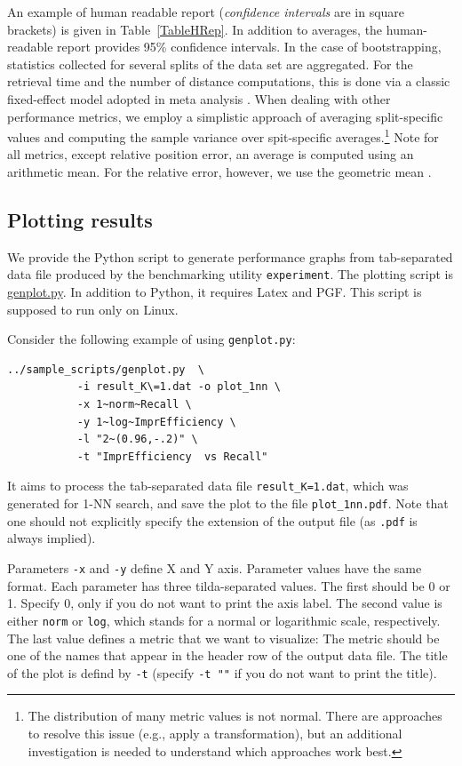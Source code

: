 \documentclass[runningheads,a4paper]{llncs}
\newcommand{\replocfile}{https://github.com/searchivarius/NonMetricSpaceLib/blob/develop/}
\newcommand{\ttt}[1]{\texttt{#1}}
\begin{document}
{An example of human readable report (\emph{confidence intervals} are in square brackets)
is given in Table~\ref{TableHRep}.
In addition to averages, the human-readable report provides 95\% confidence intervals.
In the case of bootstrapping, statistics collected for several splits of the data set are aggregated.
For the retrieval time and the number of distance computations,
this is done via a classic fixed-effect model adopted in meta analysis \cite{Hedges_and_Vevea:1998}.
When dealing with other performance metrics, 
we employ a simplistic approach of averaging split-specific values
and computing the sample variance over spit-specific averages.\footnote{The distribution
of many metric values is not normal. There are approaches to resolve this issue (e.g., apply a transformation),
but an additional investigation is needed to understand which approaches work best.}
Note for all metrics, except relative position error, an average is computed using an arithmetic mean.
For the relative error, however, we use the geometric mean  \cite{king:1986}.


\subsection{Plotting results}\label{SectionGenPlot}
We provide the Python script to generate performance graphs 
from tab-separated data file produced by the 
benchmarking utility \ttt{experiment}. 
The plotting script is \href{\replocfile sample_scripts/sample_scripts/genplot.py}{genplot.py}.
In addition to Python, it requires Latex and PGF. 
This script is supposed to run only on Linux.

Consider the following example of using \ttt{genplot.py}:
\begin{verbatim}
../sample_scripts/genplot.py  \
           -i result_K\=1.dat -o plot_1nn \
           -x 1~norm~Recall \
           -y 1~log~ImprEfficiency \
           -l "2~(0.96,-.2)" \
           -t "ImprEfficiency  vs Recall"
\end{verbatim}

It aims to process the tab-separated data file \ttt{result\_K=1.dat},
which was generated for 1-NN search, and save the plot to the file \ttt{plot\_1nn.pdf}.
Note that one should not explicitly specify the extension of the output file (as
\ttt{.pdf} is always implied).

Parameters \ttt{-x} and \ttt{-y} define  X and Y axis.
Parameter values have the same format.
Each parameter has three tilda-separated values. The first should
be 0 or 1. Specify 0, only if you do not want to print the axis label.
The second value is either \ttt{norm} or \ttt{log}, 
which stands for a normal or logarithmic scale, respectively.
The last value defines a metric that we want to visualize:
The metric should be one of the names that appear in the header row of the output data file.
The title of the plot is defind by \ttt{-t} (specify \ttt{-t ""} if you do not want
to print the title).

}
\end{document}
